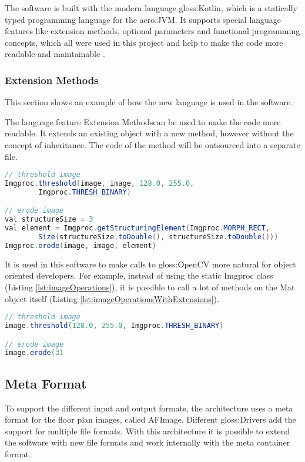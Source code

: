 The software is built with the modern language \gls{gloss:Kotlin}, which is a statically typed programming language for the \acrfull{acro:JVM}. It supports special language features like extension methods, optional parameters and functional programming concepts, which all were used in this project and help to make the code more readable and maintainable \citep{kotlin}.

\subsubsection{Extension Methods}
This section shows an example of how the new language is used in the software.

The language feature \flqq Extension Methods\frqq  can be used to make the code more readable. It extends an existing object with a new method, however without the concept of inheritance. The code of the method will be outsourced into a separate file.

\begin{lstlisting}[caption={Erode image without extension methods},label={lst:imageOperations},language=Java]
// threshold image
Imgproc.threshold(image, image, 128.0, 255.0, 
		Imgproc.THRESH_BINARY)

// erode image
val structureSize = 3
val element = Imgproc.getStructuringElement(Imgproc.MORPH_RECT, 
        Size(structureSize.toDouble(), structureSize.toDouble()))
Imgproc.erode(image, image, element)
\end{lstlisting}

It is used in this software to make calls to \gls{gloss:OpenCV} more natural for object oriented developers. For example, instead of using the static Imgproc class (Listing \ref{lst:imageOperations}), it is possible to call a lot of methods on the Mat object itself (Listing \ref{lst:imageOperationsWithExtensions}).

\begin{lstlisting}[caption={Erode image with extension methods},label={lst:imageOperationsWithExtensions},language=Java]
// threshold image
image.threshold(128.0, 255.0, Imgproc.THRESH_BINARY)

// erode image
image.erode(3)
\end{lstlisting}

\pagebreak

\subsection{Meta Format}
To support the different input and output formats, the architecture uses a meta format for the
floor plan images, called AFImage. Different \gls{gloss:Drivers} add the support for multiple file formats. With this architecture it is possible to extend the software with new file formats and work internally with the meta container format.

